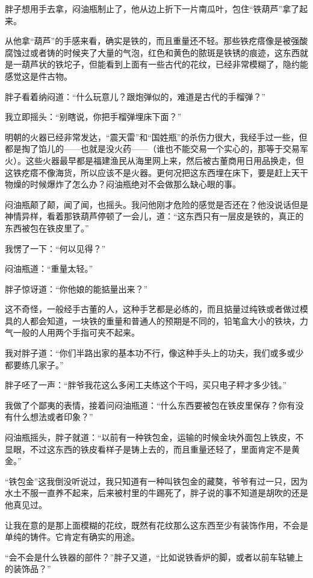 胖子想用手去拿，闷油瓶制止了，他从边上折下一片南瓜叶，包住“铁葫芦”拿了起来。

从他拿“葫芦”的手感来看，确实是铁的，而且重量还不轻。那些铁疙瘩像是被强酸腐蚀过或者铸的时候夹了大量的气泡，红色和黄色的脓斑是铁锈的痕迹，这东西就是一葫芦状的铁坨子，但能看到上面有一些古代的花纹，已经非常模糊了，隐约能感觉这是件古物。

胖子看着纳闷道：“什么玩意儿？跟炮弹似的，难道是古代的手榴弹？”

我立即摇头：“别瞎说，你把手榴弹埋床下面？”

明朝的火器已经非常发达，“震天雷”和“国姓瓶”的杀伤力很大，我经手过一些，但都是掏了馅儿的——也就是没火药——（谁也不能交易一个实心的，那等于交易军火）。这些火器最早都是福建渔民从海里网上来，然后被古董商用日用品换走，但这铁疙瘩不像海货，所以应该不是火器。更何况把这东西埋在床下，要是赶上天干物燥的时候爆炸了怎么办？闷油瓶绝对不会做那么缺心眼的事。

闷油瓶颠了颠，闻了闻，也摇头。我问他刚才危险的感觉是否还在？他没说话但是神情异样，看着那铁葫芦停顿了一会儿，道：“这东西只有一层皮是铁的，真正的东西被包在铁皮里了。”

我愣了一下：“何以见得？”

闷油瓶道：“重量太轻。”

胖子惊讶道：“你他娘的能掂量出来？”

这不奇怪，一般经手古董的人，这种手艺都是必练的，而且掂量过纯铁或者做过模具的人都会知道，一块铁的重量和普通人的预期是不同的，铅笔盒大小的铁块，力气一般的人用两个手指可夹不起来。

我对胖子道：“你们半路出家的基本功不行，像这种手头上的功夫，我们或多或少都要练几家子。”

胖子呸了一声：“胖爷我花这么多闲工夫练这个干吗，买只电子秤才多少钱。”

我做了个鄙夷的表情，接着问闷油瓶道：“什么东西要被包在铁皮里保存？你有没有什么想法或者印象？”

闷油瓶摇头，胖子就道：“以前有一种铁包金，运输的时候金块外面包上铁皮，不显眼，不过这东西的铁皮看样子是铸上去的，而且重量还轻了，里面肯定不是黄金。”

“铁包金”这我倒没听说过，我只知道有一种叫铁包金的藏獒，爷爷有过一只，因为水土不服一直养不起来，后来被村里的牛踢死了，胖子说的事不知道是胡吹的还是他真见过。

让我在意的是那上面模糊的花纹，既然有花纹那么这东西至少有装饰作用，不会是单纯的铸件。它肯定有确实的用途。

“会不会是什么铁器的部件？”胖子又道，“比如说铁香炉的脚，或者以前车轱辘上的装饰品？”

